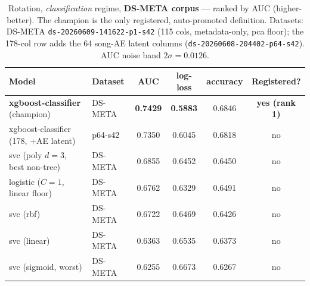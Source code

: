 \documentclass[11pt]{article}
\newcommand{\dsid}[1]{\texttt{\small #1}}
\newcommand{\best}[1]{\textbf{#1}}
\begin{document}
\begin{table}[ht]
  \centering
  \caption{Rotation, \emph{classification} regime, \textbf{DS-META corpus} ---
  ranked by AUC (higher-better). The champion is the only registered,
  auto-promoted definition. Datasets: DS-META
  \dsid{ds-20260609-141622-p1-s42} (115 cols, metadata-only, pca floor); the
  178-col row adds the 64 song-AE latent columns
  (\dsid{ds-20260608-204402-p64-s42}). AUC noise band $2\sigma=0.0126$.}
  \label{tab:lb-auc}
  \begin{tabular}{llcccc}
    \toprule
    Model & Dataset & AUC & log-loss & accuracy & Registered? \\
    \midrule
    \best{xgboost-classifier} (champion) & DS-META & \best{0.7429} & \best{0.5883} & 0.6846 & \best{yes (rank 1)} \\
    xgboost-classifier (178, +AE latent) & p64-s42 & 0.7350 & 0.6045 & 0.6818 & no \\
    svc (poly $d{=}3$, best non-tree)    & DS-META & 0.6855 & 0.6452 & 0.6450 & no \\
    logistic ($C{=}1$, linear floor)     & DS-META & 0.6762 & 0.6329 & 0.6491 & no \\
    svc (rbf)                            & DS-META & 0.6722 & 0.6469 & 0.6426 & no \\
    svc (linear)                         & DS-META & 0.6363 & 0.6535 & 0.6373 & no \\
    svc (sigmoid, worst)                 & DS-META & 0.6255 & 0.6673 & 0.6267 & no \\
    \bottomrule
  \end{tabular}
\end{table}
\end{document}
